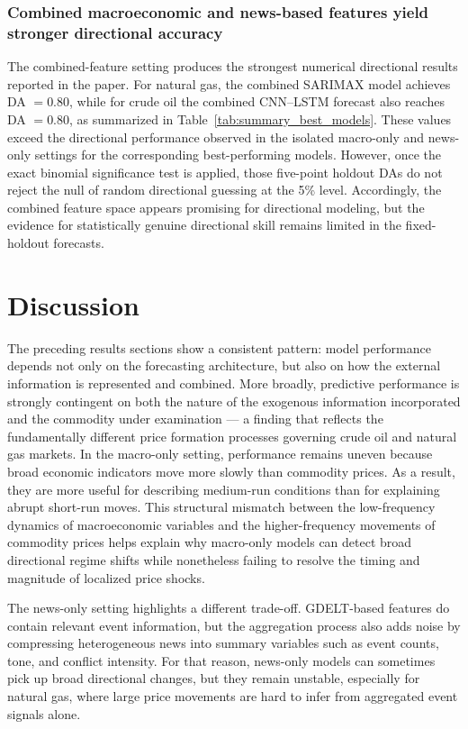 \documentclass[pdflatex,sn-mathphys-num]{sn-jnl}%
\theoremstyle{thmstyleone}%
\theoremstyle{thmstyletwo}%
\theoremstyle{thmstylethree}%
\begin{document}
\subsubsection{Combined macroeconomic and news-based features yield stronger directional accuracy}
The combined-feature setting produces the strongest numerical directional results reported in the paper. For natural gas, the combined SARIMAX model achieves DA $=0.80$, while for crude oil the combined CNN--LSTM forecast also reaches DA $=0.80$, as summarized in Table~\ref{tab:summary_best_models}. These values exceed the directional performance observed in the isolated macro-only and news-only settings for the corresponding best-performing models. However, once the exact binomial significance test is applied, those five-point holdout DAs do not reject the null of random directional guessing at the 5\% level. Accordingly, the combined feature space appears promising for directional modeling, but the evidence for statistically genuine directional skill remains limited in the fixed-holdout forecasts.

\section{Discussion}\label{sec12}

The preceding results sections show a consistent pattern: model performance depends not only on the forecasting architecture, but also on how the external information is represented and combined. More broadly, predictive performance is strongly contingent on both the nature of the exogenous information incorporated and the commodity under examination --- a finding that reflects the fundamentally different price formation processes governing crude oil and natural gas markets. In the macro-only setting, performance remains uneven because broad economic indicators move more slowly than commodity prices. As a result, they are more useful for describing medium-run conditions than for explaining abrupt short-run moves. This structural mismatch between the low-frequency dynamics of macroeconomic variables and the higher-frequency movements of commodity prices helps explain why macro-only models can detect broad directional regime shifts while nonetheless failing to resolve the timing and magnitude of localized price shocks.

The news-only setting highlights a different trade-off. GDELT-based features do contain relevant event information, but the aggregation process also adds noise by compressing heterogeneous news into summary variables such as event counts, tone, and conflict intensity. For that reason, news-only models can sometimes pick up broad directional changes, but they remain unstable, especially for natural gas, where large price movements are hard to infer from aggregated event signals alone.
\end{document}
